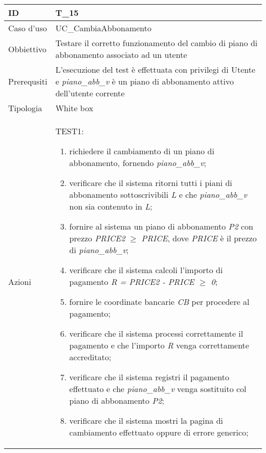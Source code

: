 \begin{table}[hb]
    \centering
    \begin{tabular}{ |p{2cm}|p{10cm}|  }
        \hline
        ID          & T\_15                                                                                                                                   \\\hline
        Caso d'uso  & UC\_CambiaAbbonamento                                                                                                                   \\\hline
        Obbiettivo  & Testare il corretto funzionamento del cambio di piano di abbonamento associato ad un utente                                             \\\hline
        Prerequsiti & L'esecuzione del test è effettuata con privilegi di Utente e \emph{piano\_abb\_v} è un piano di abbonamento attivo dell'utente corrente \\\hline
        Tipologia   & White box                                                                                                                               \\\hline
        Azioni      &
        TEST1:
        \begin{enumerate}[nosep, topsep=0pt]
            \item richiedere il cambiamento di un piano di abbonamento, fornendo \emph{piano\_abb\_v};
            \item verificare che il sistema ritorni tutti i piani di abbonamento sottoscrivibili \emph{L} e che \emph{piano\_abb\_v} non sia contenuto in \emph{L};
            \item fornire al sistema un piano di abbonamento \emph{P2} con prezzo \emph{PRICE2} $\geq$ \emph{PRICE}, dove \emph{PRICE} è il prezzo di \emph{piano\_abb\_v};
            \item verificare che il sistema calcoli l'importo di pagamento \emph{R = PRICE2 - PRICE $\geq$ 0};
            \item fornire le coordinate bancarie \emph{CB} per procedere al pagamento;
            \item verificare che il sistema processi correttamente il pagamento e che l'importo \emph{R} venga correttamente accreditato;
            \item verificare che il sistema registri il pagamento effettuato e che \emph{piano\_abb\_v} venga sostituito col piano di abbonamento \emph{P2};
            \item verificare che il sistema mostri la pagina di cambiamento effettuato oppure di errore generico;

\end{enumerate}
\end{tabular}
\end{table}
